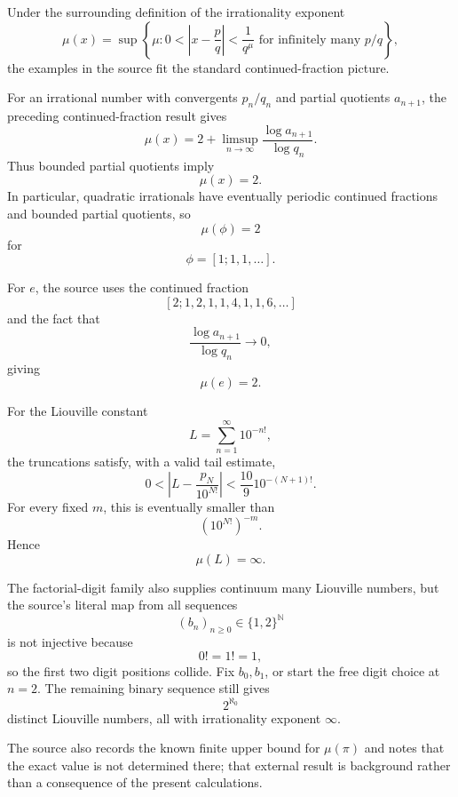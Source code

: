 \begin{solution}
Under the surrounding definition of the irrationality exponent
\[
\mu(x)
=
\sup\left\{
\mu:
0<
\left|x-\frac pq\right|
<
\frac1{q^\mu}
\text{ for infinitely many }p/q
\right\},
\]
the examples in the source fit the standard continued-fraction picture.

For an irrational number with convergents \(p_n/q_n\) and partial quotients \(a_{n+1}\), the
preceding continued-fraction result gives
\[
\mu(x)
=
2+
\limsup_{n\to\infty}
\frac{\log a_{n+1}}{\log q_n}.
\]
Thus bounded partial quotients imply
\[
\boxed{\mu(x)=2.}
\]
In particular, quadratic irrationals have eventually periodic continued fractions and bounded
partial quotients, so
\[
\mu(\phi)=2
\]
for
\[
\phi=[1;1,1,\ldots].
\]

For \(e\), the source uses the continued fraction
\[
[2;1,2,1,1,4,1,1,6,\ldots]
\]
and the fact that
\[
\frac{\log a_{n+1}}{\log q_n}\to0,
\]
giving
\[
\boxed{\mu(e)=2.}
\]

For the Liouville constant
\[
L=\sum_{n=1}^{\infty}10^{-n!},
\]
the truncations satisfy, with a valid tail estimate,
\[
0<
\left|
L-\frac{p_N}{10^{N!}}
\right|
<
\frac{10}{9}10^{-(N+1)!}.
\]
For every fixed \(m\), this is eventually smaller than
\[
(10^{N!})^{-m}.
\]
Hence
\[
\boxed{\mu(L)=\infty.}
\]

The factorial-digit family also supplies continuum many Liouville numbers, but the source's
literal map from all sequences
\[
(b_n)_{n\ge0}\in\{1,2\}^{\mathbb N}
\]
is not injective because
\[
0!=1!=1,
\]
so the first two digit positions collide. Fix \(b_0,b_1\), or start the free digit choice at
\(n=2\). The remaining binary sequence still gives
\[
2^{\aleph_0}
\]
distinct Liouville numbers, all with irrationality exponent \(\infty\).

The source also records the known finite upper bound for \(\mu(\pi)\) and notes that the exact
value is not determined there; that external result is background rather than a consequence
of the present calculations.
\end{solution}


